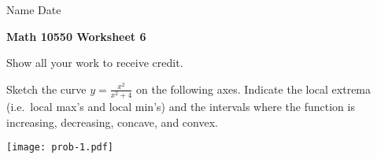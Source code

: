 \documentclass[12pt]{article}
\begin{document}
\hskip0.01in Name \underline{\hskip 4.5in}
\hskip0.2in
  Date \underline{\hskip 1in}


\begin{center}
\textbf{Math 10550 Worksheet 6}

Show all your work to receive credit.
\end{center}


 Sketch the curve $\displaystyle y = \frac{x^{2}}{x^2 +
    4}$ on the following axes. Indicate the local extrema (i.e.\ local max's and
local min's) and the intervals where the function is
increasing, decreasing, concave, and convex. 
\vspace{-16em}
\begin{center}
\texttt{[image: prob-1.pdf]}
\end{center}
\vspace{-20em}
\end{document}
